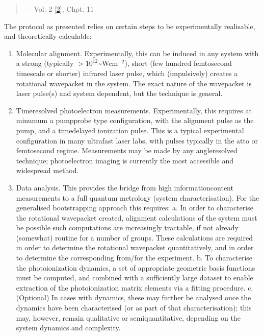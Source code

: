 \documentclass[letterpaper,table,10pt,english]{jupyterBook}
\begin{document}
\begin{quote}
\begin{flushright}
--- Vol. 2 {[}\hyperlink{cite.backmatter/bibliography:id570}{2}{]}, Chpt. 11
\end{flushright}
\end{quote}

\sphinxAtStartPar
The protocol as presented relies on certain steps to be experimentally realisable, and theoretically calculable:
\begin{enumerate}
%
\item {} 
\sphinxAtStartPar
Molecular alignment. Experimentally, this can be induced in any system with a strong (typically \(>10^{12}\)\textasciitilde{}Wcm\(^{-2}\)), short (few hundred femtosecond timescale or shorter) infra\sphinxhyphen{}red laser pulse, which (impulsively) creates a rotational wavepacket in the system. The exact nature of the wavepacket is laser pulse(s) and system dependent, but the technique is general.

\item {} 
\sphinxAtStartPar
Time\sphinxhyphen{}resolved photoelectron measurements. Experimentally, this requires \sphinxhyphen{} at minumum \sphinxhyphen{} a pump\sphinxhyphen{}probe type configuration, with the alignment pulse as the pump, and a time\sphinxhyphen{}delayed ionization pulse. This is a typical experimental configuration in many ultrafast laser labs, with pulses typically in the atto\sphinxhyphen{} or femto\sphinxhyphen{}second regime. Measurements may be made by any angle\sphinxhyphen{}resolved technique; photoelectron imaging is currently the most accessible and widespread method.

\item {} 
\sphinxAtStartPar
Data analysis. This provides the bridge from high information\sphinxhyphen{}content measurements to a full quantum metrology (system characterisation). For the generalised bootstrapping approach this requires:
a. In order to characterise the rotational wavepacket created, alignment calculations of the system must be possible \sphinxhyphen{} such computations are increasingly tractable, if not already (somewhat) routine for a number of groups. These calculations are required in order to determine the rotational wavepacket quantitatively, and in order to determine the corresponding {\hyperref[\detokenize{backmatter/glossary:term-ADMs}]{}} from/for the experiment.
b. To characterise the  photoionization dynamics, a set of appropriate geometric basis functions must be computed, and combined with a sufficiently large dataset to enable extraction of the photoionization matrix elements via a fitting procedure.
c. (Optional) In cases with  dynamics, these may further be analysed once the  dynamics have been characterised (or as part of that characterisation); this may, however, remain qualitative or semi\sphinxhyphen{}quantitative, depending on the system dynamics and complexity.


\end{enumerate}
\end{document}

